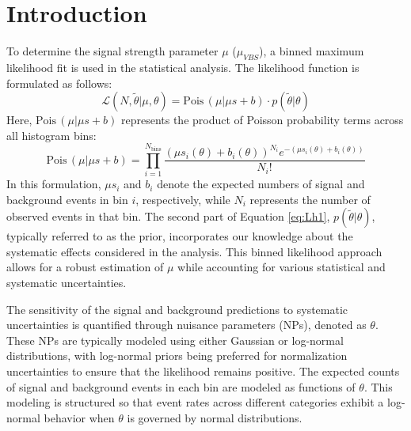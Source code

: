 \clearpage
\section{Introduction}
\label{sec:mll_def}

To determine the signal strength parameter $\mu$ ($\mu_{VBS}$), a binned maximum likelihood fit is used in the statistical analysis. The likelihood function is formulated as follows:
\begin{equation} \label{eq:Lh1}
	\mathcal{L}(N, \tilde{\theta} | \mu, \theta) = \mathrm{Pois}\,(\mu | \mu s + b) \cdot p(\tilde{\theta} | \theta)
\end{equation}
Here, $\mathrm{Pois}\,(\mu | \mu s + b)$ represents the product of Poisson probability terms across all histogram bins:
\begin{equation} \label{eq:Lh2}
	\mathrm{Pois}\,(\mu | \mu s + b) = \prod_{i=1}^{N_{\text{bins}}} \frac{(\mu s_{i}(\theta) + b_{i}(\theta))^{N_{i}} e^{- (\mu s_{i}(\theta) + b_{i}(\theta))}}{N_{i}!}
\end{equation}
In this formulation, $\mu s_{i}$ and $b_{i}$ denote the expected numbers of signal and background events in bin $i$, respectively, while $N_{i}$ represents the number of observed events in that bin. The second part of Equation \ref{eq:Lh1}, $p(\tilde{\theta} | \theta)$, typically referred to as the prior, incorporates our knowledge about the systematic effects considered in the analysis. This binned likelihood approach allows for a robust estimation of $\mu$ while accounting for various statistical and systematic uncertainties.

%
%

The sensitivity of the signal and background predictions to systematic uncertainties is quantified through nuisance parameters (NPs), denoted as $\theta$. 
These NPs are typically modeled using either Gaussian or log-normal distributions, with log-normal priors being preferred for normalization uncertainties to ensure that the likelihood remains positive. The expected counts of signal and background events in each bin are modeled as functions of $\theta$. This modeling is structured so that event rates across different categories exhibit a log-normal behavior when $\theta$ is governed by normal distributions.

